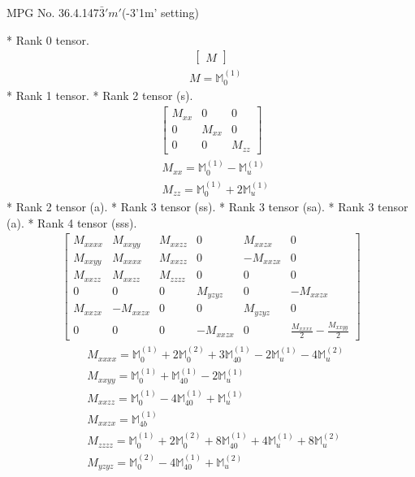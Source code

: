 \documentclass[fleqn,8pt,landscape]{jsarticle}
\begin{document}
\setcounter{MaxMatrixCols}{32}

\renewcommand{\tablename}{Table~}
\renewcommand{\figurename}{Figure~}
\begin{center}
\LARGE
MPG No. 36.4.147\quad$\bar{3}'m'$\quad(-3'1m' setting)
\end{center}
* Rank 0 tensor.
\begin{align*}
\begin{bmatrix} M \end{bmatrix}
\end{align*}
\begin{align*}
& M = \mathbb{M}_{0}^{(1)}
\end{align*}
* Rank 1 tensor.
* Rank 2 tensor (s).
\begin{align*}
\begin{bmatrix} M_{xx} & 0 & 0 \\ 0 & M_{xx} & 0 \\ 0 & 0 & M_{zz} \end{bmatrix}
\end{align*}
\begin{align*}
& M_{xx} = \mathbb{M}_{0}^{(1)} - \mathbb{M}_{u}^{(1)} \\
& M_{zz} = \mathbb{M}_{0}^{(1)} + 2 \mathbb{M}_{u}^{(1)}
\end{align*}
* Rank 2 tensor (a).
* Rank 3 tensor (ss).
* Rank 3 tensor (sa).
* Rank 3 tensor (a).
* Rank 4 tensor (sss).
\begin{align*}
\begin{bmatrix} M_{xxxx} & M_{xxyy} & M_{xxzz} & 0 & M_{xxzx} & 0 \\ M_{xxyy} & M_{xxxx} & M_{xxzz} & 0 & - M_{xxzx} & 0 \\ M_{xxzz} & M_{xxzz} & M_{zzzz} & 0 & 0 & 0 \\ 0 & 0 & 0 & M_{yzyz} & 0 & - M_{xxzx} \\ M_{xxzx} & - M_{xxzx} & 0 & 0 & M_{yzyz} & 0 \\ 0 & 0 & 0 & - M_{xxzx} & 0 & \frac{M_{xxxx}}{2} - \frac{M_{xxyy}}{2} \end{bmatrix}
\end{align*}
\begin{align*}
& M_{xxxx} = \mathbb{M}_{0}^{(1)} + 2 \mathbb{M}_{0}^{(2)} + 3 \mathbb{M}_{40}^{(1)} - 2 \mathbb{M}_{u}^{(1)} - 4 \mathbb{M}_{u}^{(2)} \\
& M_{xxyy} = \mathbb{M}_{0}^{(1)} + \mathbb{M}_{40}^{(1)} - 2 \mathbb{M}_{u}^{(1)} \\
& M_{xxzz} = \mathbb{M}_{0}^{(1)} - 4 \mathbb{M}_{40}^{(1)} + \mathbb{M}_{u}^{(1)} \\
& M_{xxzx} = \mathbb{M}_{4b}^{(1)} \\
& M_{zzzz} = \mathbb{M}_{0}^{(1)} + 2 \mathbb{M}_{0}^{(2)} + 8 \mathbb{M}_{40}^{(1)} + 4 \mathbb{M}_{u}^{(1)} + 8 \mathbb{M}_{u}^{(2)} \\
& M_{yzyz} = \mathbb{M}_{0}^{(2)} - 4 \mathbb{M}_{40}^{(1)} + \mathbb{M}_{u}^{(2)}
\end{align*}
\end{document}
